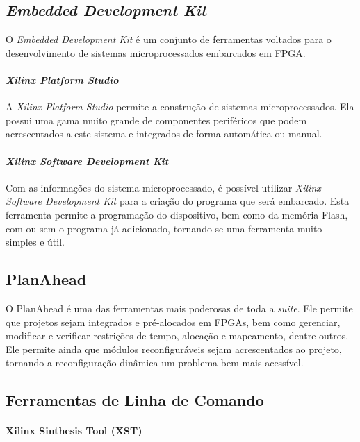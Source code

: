 \documentclass[11pt,a4paper,oneside]{book}
\begin{document}
\subsection{\textit{Embedded Development Kit}}
O \textit{Embedded Development Kit} é um conjunto de ferramentas voltados para o desenvolvimento de sistemas microprocessados embarcados em FPGA.

\paragraph{\textit{Xilinx Platform Studio}}
A \textit{Xilinx Platform Studio} permite a construção de sistemas microprocessados.
Ela possui uma gama muito grande de componentes periféricos que podem acrescentados a este sistema e integrados de forma automática ou manual.

\paragraph{\textit{Xilinx Software Development Kit}}
Com as informações do sistema microprocessado, é possível utilizar \textit{Xilinx Software Development Kit} para a criação do programa que será embarcado.
Esta ferramenta permite a programação do dispositivo, bem como da memória Flash, com ou sem o programa já adicionado, tornando-se uma ferramenta muito simples e útil.

\subsection{PlanAhead}
O PlanAhead é uma das ferramentas mais poderosas de toda a \textit{suite}.
Ele permite que projetos sejam integrados e pré-alocados em FPGAs, bem como gerenciar, modificar e verificar restrições de tempo, alocação e mapeamento, dentre outros.
Ele permite ainda que módulos reconfiguráveis sejam acrescentados ao projeto, tornando a reconfiguração dinâmica um problema bem mais acessível.

\subsection{Ferramentas de Linha de Comando}
\paragraph{Xilinx Sinthesis Tool (XST)}


\ifx\compilewholereport\undefined
	 
	\newsavebox\mytempbib\savebox\mytempbib{\parbox{\textwidth}{}}
	
\end{document}
